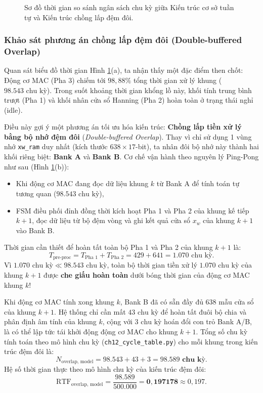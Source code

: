\begin{figure}[htbp]
\centering

\caption{Sơ đồ thời gian so sánh ngân sách chu kỳ giữa Kiến trúc cơ sở tuần tự và Kiến trúc chồng lấp đệm đôi.}
\label{fig:ch12_cycle_timeline}
\end{figure}

\subsubsection*{Khảo sát phương án chồng lấp đệm đôi (Double-buffered Overlap)}
Quan sát biểu đồ thời gian Hình \ref{fig:ch12_cycle_timeline}(a), ta nhận thấy một đặc điểm then chốt: Động cơ MAC (Pha 3) chiếm tới $98{,}88\%$ tổng thời gian xử lý khung ($98.543\text{ chu kỳ}$). Trong suốt khoảng thời gian khổng lồ này, khối tính trung bình trượt (Pha 1) và khối nhân cửa sổ Hanning (Pha 2) hoàn toàn ở trạng thái nghỉ (idle).

Điều này gợi ý một phương án tối ưu hóa kiến trúc: \textbf{Chồng lấp tiền xử lý bằng bộ nhớ đệm đôi} (\emph{Double-buffered Overlap}).
Thay vì chỉ sử dụng 1 vùng nhớ \texttt{xw\_ram} duy nhất (kích thước $638 \times 17$-bit), ta nhân đôi bộ nhớ này thành hai khối riêng biệt: \textbf{Bank A} và \textbf{Bank B}. Cơ chế vận hành theo nguyên lý Ping-Pong như sau (Hình \ref{fig:ch12_cycle_timeline}(b)):
\begin{itemize}
    \item Khi động cơ MAC đang đọc dữ liệu khung $k$ từ Bank A để tính toán tự tương quan ($98.543\text{ chu kỳ}$),
    \item FSM điều phối đỉnh đồng thời kích hoạt Pha 1 và Pha 2 của khung kế tiếp $k+1$, đọc dữ liệu từ bộ đệm vòng và ghi kết quả cửa sổ $x_w$ của khung $k+1$ vào Bank B.
\end{itemize}

Thời gian cần thiết để hoàn tất toàn bộ Pha 1 và Pha 2 của khung $k+1$ là:
\begin{equation}
    T_{\text{pre-proc}} = T_{\text{Pha 1}} + T_{\text{Pha 2}} = 429 + 641 = 1.070\text{ chu kỳ}.
\end{equation}
Vì $1.070\text{ chu kỳ} \ll 98.543\text{ chu kỳ}$, toàn bộ thời gian tiền xử lý $1.070\text{ chu kỳ}$ của khung $k+1$ được \textbf{che giấu hoàn toàn} dưới bóng thời gian của động cơ MAC khung $k$!

Khi động cơ MAC tính xong khung $k$, Bank B đã có sẵn đầy đủ 638 mẫu cửa sổ của khung $k+1$. Hệ thống chỉ cần mất $43\text{ chu kỳ}$ để hoàn tất đuôi bộ chia và phân định âm tính của khung $k$, cộng với $3\text{ chu kỳ}$ hoán đổi con trỏ Bank A/B, là có thể lập tức tái khởi động động cơ MAC cho khung $k+1$.
Tổng số chu kỳ tính toán theo mô hình chu kỳ (\texttt{ch12\_cycle\_table.py}) cho mỗi khung trong kiến trúc đệm đôi là:
\begin{equation}
    N_{\text{overlap, model}} = 98.543 + 43 + 3 = \mathbf{98.589\text{ chu kỳ}}.
\end{equation}
Hệ số thời gian thực theo mô hình chu kỳ của kiến trúc đệm đôi:
\begin{equation}
    \text{RTF}_{\text{overlap, model}} = \frac{98.589}{500.000} = \mathbf{0{,}197178} \approx 0{,}197.
\end{equation}

